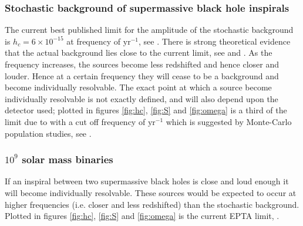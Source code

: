 \subsubsection{Stochastic background of supermassive black hole inspirals}
The current best published limit for the amplitude of the stochastic background is $h_{c}=6\times 10^{-15}$ at frequency of $\textrm{yr}^{-1}$, see \cite{Haasteren}. There is strong theoretical evidence that the actual background lies close to the current limit, see \cite{imminentdetectionofgravitationalwaves} and \cite{NONimminentdetectionofgravitationalwaves}. As the frequency increases, the sources become less redshifted and hence closer and louder. Hence at a certain frequency they will cease to be a background and become individually resolvable. The exact point at which a source become individually resolvable is not exactly defined, and will also depend upon the detector used; plotted in figures \ref{fig:hc}, \ref{fig:S} and \ref{fig:omega} is a third of the limit due to \cite{Haasteren} with a cut off frequency of $\textrm{yr}^{-1}$ which is suggested by Monte-Carlo population studies, see \cite{SesanaVecchioColancino}.

\subsubsection{$10^{9}$ solar mass binaries}
If an inspiral between two supermassive black holes is close and loud enough it will become individually resolvable. These sources would be expected to occur at higher frequencies (i.e. closer and less redshifted) than the stochastic background. Plotted in figures \ref{fig:hc}, \ref{fig:S} and \ref{fig:omega} is the current EPTA limit, \cite{Haasteren}.



